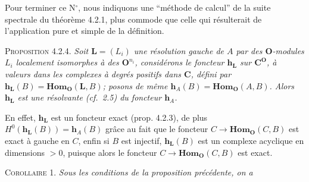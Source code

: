 Pour terminer ce N$^\circ$, nous indiquons une ``méthode de calcul'' de la
suite spectrale du théorème 4.2.1, plus commode que celle qui résulterait de
l'application pure et simple de la définition.

\textsc{Proposition 4.2.4.} \textit{Soit
$\mathbf{L}=(L_i)$ une résolution gauche de $A$ par des ${\mathbf O}$-modules $L_i$
localement isomorphes à des ${\mathbf O}^{n_i}$, considérons le foncteur
$\mathbf{h}_{\mathbf{L}}$ sur $\mathbf C^{\mathbf O}$, à valeurs dans les complexes à degrés
positifs dans $\mathbf C$, défini par
$\mathbf{h}_{\mathbf{L}}(B)=\mathbf{Hom}_{\mathbf O}(\mathbf{L},B)$; posons de même
$\mathbf{h}_A(B)=\mathbf{Hom}_{\mathbf O}(A,B)$. Alors $\mathbf{h}_{\mathbf{L}}$ est une
résolvante \textup{(}cf.\ \textup{2.5)} du foncteur $\mathbf{h}_A$.}

En effet, $\mathbf{h}_{\mathbf{L}}$ est un foncteur exact (prop. 4.2.3), de
plus $H^0(\mathbf{h}_{\mathbf{L}}(B))=\mathbf{h}_A(B)$ grâce au fait que le
foncteur $C\to\mathbf{Hom}_{\mathbf O}(C,B)$ est exact à gauche en $C$, enfin si
$B$ est injectif, $\mathbf{h}_{\mathbf{L}}(B)$ est un complexe acyclique en
dimensions $>0$, puisque alors le foncteur
$C\to\mathbf{Hom}_{\mathbf O}(C,B)$ est exact.

\textsc{Corollaire 1.} \textit{Sous les conditions de la proposition
précédente, on a}

